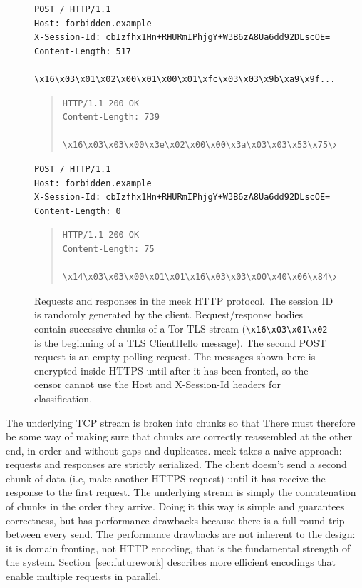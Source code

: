 \documentclass[conference]{IEEEtran}
\begin{document}
\begin{figure}
\scriptsize
\begin{verbatim}
POST / HTTP/1.1
Host: forbidden.example
X-Session-Id: cbIzfhx1Hn+RHURmIPhjgY+W3B6zA8Ua6dd92DLscOE=
Content-Length: 517

\x16\x03\x01\x02\x00\x01\x00\x01\xfc\x03\x03\x9b\xa9\x9f...
\end{verbatim}
\smallskip
\begin{quote}
\begin{verbatim}
HTTP/1.1 200 OK
Content-Length: 739

\x16\x03\x03\x00\x3e\x02\x00\x00\x3a\x03\x03\x53\x75\xa2...
\end{verbatim}
\end{quote}
\smallskip
\begin{verbatim}
POST / HTTP/1.1
Host: forbidden.example
X-Session-Id: cbIzfhx1Hn+RHURmIPhjgY+W3B6zA8Ua6dd92DLscOE=
Content-Length: 0

\end{verbatim}
\smallskip
\begin{quote}
\begin{verbatim}
HTTP/1.1 200 OK
Content-Length: 75

\x14\x03\x03\x00\x01\x01\x16\x03\x03\x00\x40\x06\x84\x25...
\end{verbatim}
\end{quote}
\caption{
Requests and responses in the meek HTTP protocol.
The session ID is randomly generated by the client.
Request/response bodies contain successive chunks of a Tor TLS stream
(\texttt{\textbackslash{}x16\textbackslash{}x03\textbackslash{}x01\textbackslash{}x02}
is the beginning of a TLS ClientHello message).
The second POST request is an empty polling request.
The messages shown here is encrypted inside HTTPS until after
it has been fronted,
so the censor cannot use the
Host and X-Session-Id headers for classification.
}
\label{fig:protocol}
\end{figure}

The underlying TCP stream is broken into chunks so that
There must therefore be some way of making sure that chunks
are correctly reassembled at the other end,
in order and without gaps and duplicates.
meek takes a naive approach: requests and responses are strictly serialized.
The client doesn't send a second chunk of data
(i.e, make another HTTPS request) until it has
receive the response to the first request.
The underlying stream is simply the concatenation
of chunks in the order they arrive.
Doing it this way is simple and guarantees correctness,
but has performance drawbacks because there is a full round-trip
between every send.
The performance drawbacks are not inherent to the design:
it is domain fronting, not HTTP encoding, that is the fundamental strength of the system.
Section~\ref{sec:futurework} describes more efficient encodings
that enable multiple requests in parallel.
\end{document}
